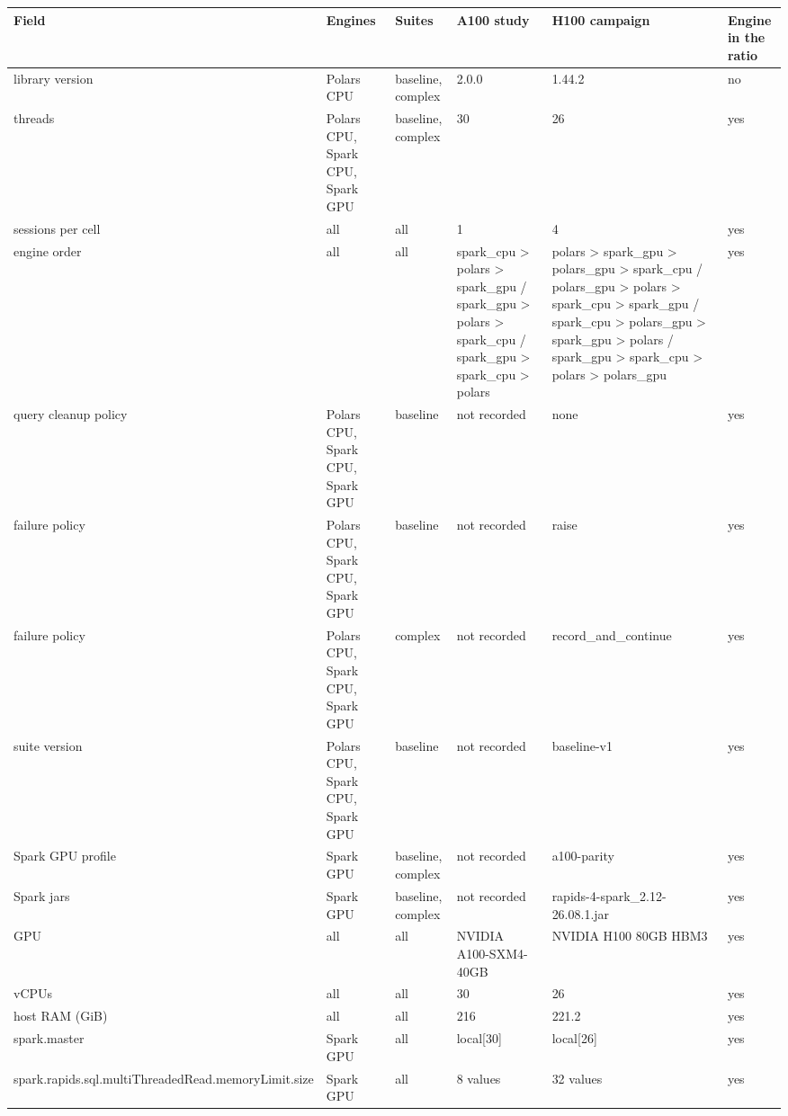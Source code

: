 \begin{longtable}{llllll}
\toprule
Field & Engines & Suites & A100 study & H100 campaign & Engine in the ratio \\
\midrule
\endhead
\bottomrule
\endfoot
library version & Polars CPU & baseline, complex & 2.0.0 & 1.44.2 & no \\
threads & Polars CPU, Spark CPU, Spark GPU & baseline, complex & 30 & 26 & yes \\
sessions per cell & all & all & 1 & 4 & yes \\
engine order & all & all & spark\_cpu > polars > spark\_gpu / spark\_gpu > polars > spark\_cpu / spark\_gpu > spark\_cpu > polars & polars > spark\_gpu > polars\_gpu > spark\_cpu / polars\_gpu > polars > spark\_cpu > spark\_gpu / spark\_cpu > polars\_gpu > spark\_gpu > polars / spark\_gpu > spark\_cpu > polars > polars\_gpu & yes \\
query cleanup policy & Polars CPU, Spark CPU, Spark GPU & baseline & not recorded & none & yes \\
failure policy & Polars CPU, Spark CPU, Spark GPU & baseline & not recorded & raise & yes \\
failure policy & Polars CPU, Spark CPU, Spark GPU & complex & not recorded & record\_and\_continue & yes \\
suite version & Polars CPU, Spark CPU, Spark GPU & baseline & not recorded & baseline-v1 & yes \\
Spark GPU profile & Spark GPU & baseline, complex & not recorded & a100-parity & yes \\
Spark jars & Spark GPU & baseline, complex & not recorded & rapids-4-spark\_2.12-26.08.1.jar & yes \\
GPU & all & all & NVIDIA A100-SXM4-40GB & NVIDIA H100 80GB HBM3 & yes \\
vCPUs & all & all & 30 & 26 & yes \\
host RAM (GiB) & all & all & 216 & 221.2 & yes \\
spark.master & Spark GPU & all & local[30] & local[26] & yes \\
spark.rapids.sql.multiThreadedRead.memoryLimit.size & Spark GPU & all & 8 values & 32 values & yes \\
\end{longtable}
